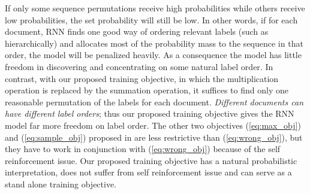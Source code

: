 If only some sequence permutations receive high probabilities while others receive low probabilities, the set probability will still be low. In other words, if for each document, RNN finds one  good way of ordering relevant labels (such as hierarchically) and allocates most of the probability mass to the sequence in that order, the model will be penalized heavily.  As a consequence the model has little freedom in discovering and concentrating on some natural label order. In contrast, with our proposed training objective, in which the multiplication operation is replaced by the  summation operation, it suffices to find only one reasonable permutation of the labels for each document. \emph{Different documents can have different label orders}; thus our proposed training objective gives the RNN model far more freedom on label order. The other two objectives (\ref{eq:max_obj}) and (\ref{eq:sample_obj}) proposed in \cite{vinyals2015order} are less restrictive than  (\ref{eq:wrong_obj}), but they have to work in conjunction with (\ref{eq:wrong_obj}) because of the self reinforcement issue. Our proposed training objective has a natural probabilistic interpretation, does not suffer from self reinforcement issue and can serve as a stand alone training objective. 


